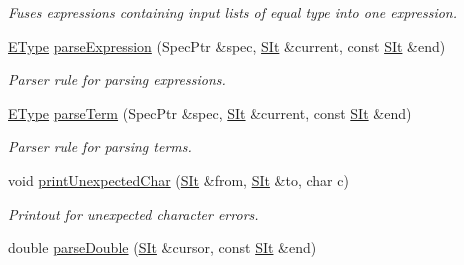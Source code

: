 \begin{DoxyCompactItemize}
\begin{DoxyCompactList}\small\item\em Fuses expressions containing input lists of equal type into one expression. \end{DoxyCompactList}\item 
\hyperlink{classgiskard__suturo_1_1GiskardLangParser_adbdbadf4ee4e2afb358b4ff98bf7daa2}{E\-Type} \hyperlink{classgiskard__suturo_1_1GiskardLangParser_ab8b0efa140244252d6ff0c1219e167a7}{parse\-Expression} (Spec\-Ptr \&spec, \hyperlink{classgiskard__suturo_1_1GiskardLangParser_aaebad1dc1afc92c7bdc1aa7e4d679621}{S\-It} \&current, const \hyperlink{classgiskard__suturo_1_1GiskardLangParser_aaebad1dc1afc92c7bdc1aa7e4d679621}{S\-It} \&end)
\begin{DoxyCompactList}\small\item\em Parser rule for parsing expressions. \end{DoxyCompactList}\item 
\hyperlink{classgiskard__suturo_1_1GiskardLangParser_adbdbadf4ee4e2afb358b4ff98bf7daa2}{E\-Type} \hyperlink{classgiskard__suturo_1_1GiskardLangParser_abf66b718b63bd6f716f099322bf9985a}{parse\-Term} (Spec\-Ptr \&spec, \hyperlink{classgiskard__suturo_1_1GiskardLangParser_aaebad1dc1afc92c7bdc1aa7e4d679621}{S\-It} \&current, const \hyperlink{classgiskard__suturo_1_1GiskardLangParser_aaebad1dc1afc92c7bdc1aa7e4d679621}{S\-It} \&end)
\begin{DoxyCompactList}\small\item\em Parser rule for parsing terms. \end{DoxyCompactList}\item 
void \hyperlink{classgiskard__suturo_1_1GiskardLangParser_acb4fbd0a6104585c572d621193d67eae}{print\-Unexpected\-Char} (\hyperlink{classgiskard__suturo_1_1GiskardLangParser_aaebad1dc1afc92c7bdc1aa7e4d679621}{S\-It} \&from, \hyperlink{classgiskard__suturo_1_1GiskardLangParser_aaebad1dc1afc92c7bdc1aa7e4d679621}{S\-It} \&to, char c)
\begin{DoxyCompactList}\small\item\em Printout for unexpected character errors. \end{DoxyCompactList}\item 
double \hyperlink{classgiskard__suturo_1_1GiskardLangParser_acebe1799a49236e0d50e9c07592abd7f}{parse\-Double} (\hyperlink{classgiskard__suturo_1_1GiskardLangParser_aaebad1dc1afc92c7bdc1aa7e4d679621}{S\-It} \&cursor, const \hyperlink{classgiskard__suturo_1_1GiskardLangParser_aaebad1dc1afc92c7bdc1aa7e4d679621}{S\-It} \&end)

\end{DoxyCompactItemize}
